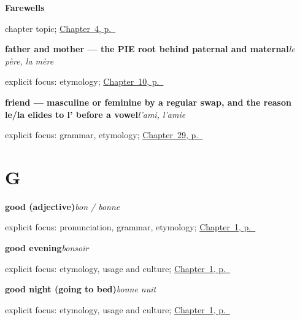 \noindent\begin{minipage}[t]{\linewidth}
\raggedright
\textbf{Farewells}\par
\footnotesize chapter topic; \hyperref[ch:farewells]{Chapter~4, p.~\pageref*{ch:farewells}}
\end{minipage}\par\smallskip

\noindent\begin{minipage}[t]{\linewidth}
\raggedright
\textbf{father and mother — the PIE root behind paternal and maternal}\enspace\emph{le père, la mère}\par
\footnotesize explicit focus: etymology; \hyperref[ch:family]{Chapter~10, p.~\pageref*{ch:family}}
\end{minipage}\par\smallskip

\noindent\begin{minipage}[t]{\linewidth}
\raggedright
\textbf{friend — masculine or feminine by a regular swap, and the reason le/la elides to l' before a vowel}\enspace\emph{l'ami, l'amie}\par
\footnotesize explicit focus: grammar, etymology; \hyperref[ch:fr-the-people-you-introduce]{Chapter~29, p.~\pageref*{ch:fr-the-people-you-introduce}}
\end{minipage}\par\smallskip

\section*{G}

\noindent\begin{minipage}[t]{\linewidth}
\raggedright
\textbf{good (adjective)}\enspace\emph{bon / bonne}\par
\footnotesize explicit focus: pronunciation, grammar, etymology; \hyperref[ch:greetings]{Chapter~1, p.~\pageref*{ch:greetings}}
\end{minipage}\par\smallskip

\noindent\begin{minipage}[t]{\linewidth}
\raggedright
\textbf{good evening}\enspace\emph{bonsoir}\par
\footnotesize explicit focus: etymology, usage and culture; \hyperref[ch:greetings]{Chapter~1, p.~\pageref*{ch:greetings}}
\end{minipage}\par\smallskip

\noindent\begin{minipage}[t]{\linewidth}
\raggedright
\textbf{good night (going to bed)}\enspace\emph{bonne nuit}\par
\footnotesize explicit focus: etymology, usage and culture; \hyperref[ch:greetings]{Chapter~1, p.~\pageref*{ch:greetings}}
\end{minipage}\par\smallskip

